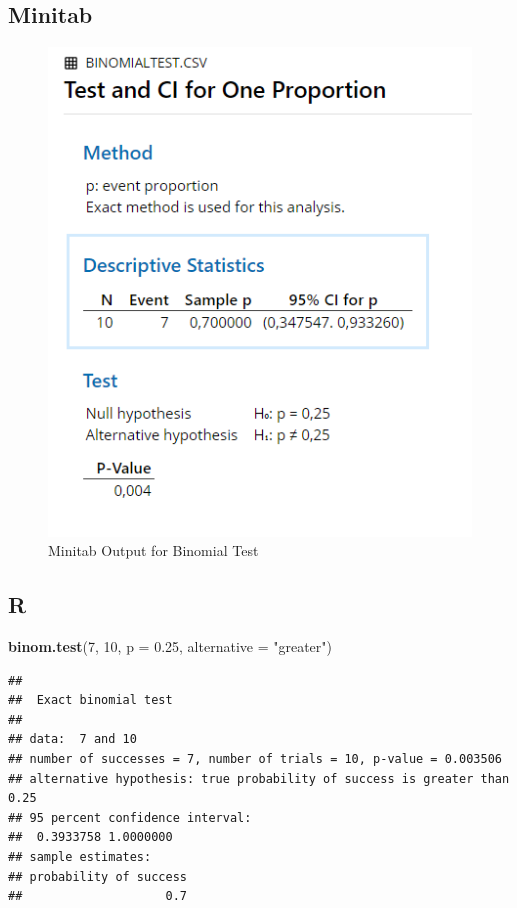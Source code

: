 \documentclass[
]{book}
\newenvironment{Shaded}{\begin{snugshade}}{\end{snugshade}}
\newcommand{\DataTypeTok}[1]{\textcolor[rgb]{0.13,0.29,0.53}{#1}}
\newcommand{\DecValTok}[1]{\textcolor[rgb]{0.00,0.00,0.81}{#1}}
\newcommand{\FloatTok}[1]{\textcolor[rgb]{0.00,0.00,0.81}{#1}}
\newcommand{\KeywordTok}[1]{\textcolor[rgb]{0.13,0.29,0.53}{\textbf{#1}}}
\newcommand{\NormalTok}[1]{#1}
\newcommand{\StringTok}[1]{\textcolor[rgb]{0.31,0.60,0.02}{#1}}
\begin{document}
\hypertarget{minitab}{%
\subsection{Minitab}\label{minitab}}

\begin{figure}[!h]
\includegraphics{Screenshots/Binomial Test/BinomialTestMinitab} \caption{\label{fig:BinomialTestMinitab}Minitab Output for Binomial Test}\label{fig:BinomialTestMinitab}
\end{figure}

\hypertarget{r}{%
\subsection{R}\label{r}}

\begin{Shaded}
\begin{Highlighting}[]
\KeywordTok{binom.test}\NormalTok{(}\DecValTok{7}\NormalTok{, }\DecValTok{10}\NormalTok{, }\DataTypeTok{p =} \FloatTok{0.25}\NormalTok{, }\DataTypeTok{alternative =} \StringTok{"greater"}\NormalTok{)}
\end{Highlighting}
\end{Shaded}

\begin{verbatim}
## 
## 	Exact binomial test
## 
## data:  7 and 10
## number of successes = 7, number of trials = 10, p-value = 0.003506
## alternative hypothesis: true probability of success is greater than 0.25
## 95 percent confidence interval:
##  0.3933758 1.0000000
## sample estimates:
## probability of success 
##                    0.7
\end{verbatim}
\end{document}
